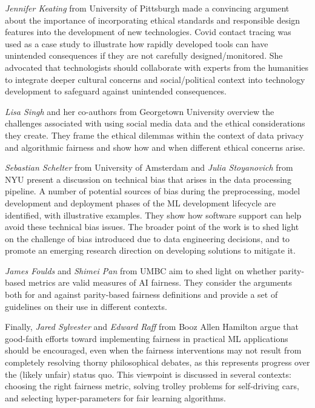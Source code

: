 \documentclass[11pt]{article}
\begin{document}
\textit{Jennifer Keating} from University of Pittsburgh made a convincing argument about the importance of incorporating ethical standards and responsible design features into the development of new technologies. Covid contact tracing was used as a case study to illustrate how rapidly developed tools can have unintended consequences if they are not carefully designed/monitored. She advocated that technologists should collaborate with experts from the humanities to integrate deeper cultural concerns and social/political context into technology development to safeguard against unintended consequences.

\textit{Lisa Singh} and her co-authors from Georgetown University overview the challenges associated with using social media data and the ethical considerations they create.  They frame the ethical dilemmas within the context of data privacy and algorithmic fairness and show how and when different ethical concerns arise.  

\textit{Sebastian Schelter} from University of Amsterdam and \textit{Julia Stoyanovich}  from NYU present a discussion on technical bias that arises in the data processing pipeline.  A number of potential sources of bias during the preprocessing, model development and deployment phases of the ML development lifecycle are identified, with illustrative examples.  They  show how software support can help avoid these technical bias issues.  The broader point of the work is to shed light on the challenge of bias introduced due to data engineering decisions, and to promote an emerging research direction on developing solutions to mitigate it.

\textit{James Foulds} and \textit{Shimei Pan} from UMBC  aim to shed light on whether parity-based metrics are valid measures of AI fairness. They consider the arguments both for and against parity-based fairness definitions and provide a set of guidelines on their use in different contexts. 

Finally, \textit{Jared Sylvester} and \textit{Edward Raff} from Booz Allen Hamilton argue that good-faith efforts toward implementing fairness in practical ML applications should be encouraged, even when the fairness interventions may not result from completely resolving thorny philosophical debates, as this represents progress over the (likely unfair) status quo.  This viewpoint is discussed in several contexts: choosing the right fairness metric, solving trolley problems for self-driving cars, and selecting hyper-parameters for fair learning algorithms.

\end{document}
